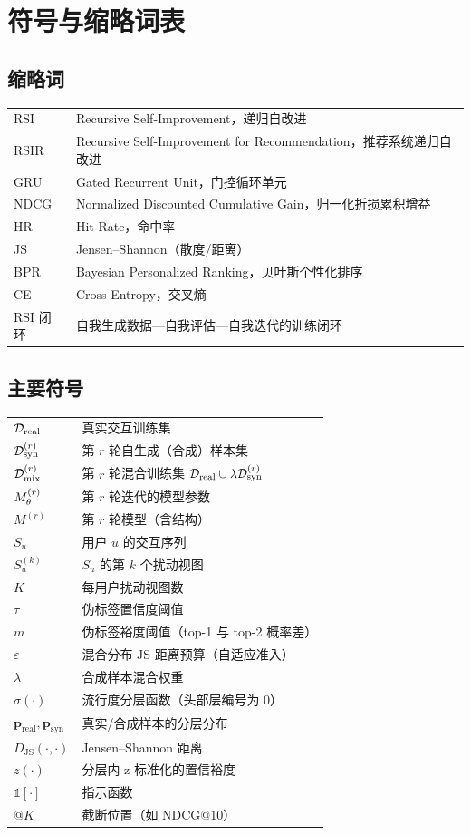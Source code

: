 \chapter*{符号与缩略词表}

\section*{缩略词}
\begin{tabular}{ll}
RSI & Recursive Self-Improvement，递归自改进\\
RSIR & Recursive Self-Improvement for Recommendation，推荐系统递归自改进\\
GRU & Gated Recurrent Unit，门控循环单元\\
NDCG & Normalized Discounted Cumulative Gain，归一化折损累积增益\\
HR & Hit Rate，命中率\\
JS & Jensen--Shannon（散度/距离）\\
BPR & Bayesian Personalized Ranking，贝叶斯个性化排序\\
CE & Cross Entropy，交叉熵\\
RSI 闭环 & 自我生成数据—自我评估—自我迭代的训练闭环\\
\end{tabular}

\section*{主要符号}
\begin{tabular}{ll}
$\mathcal{D}_{\mathrm{real}}$ & 真实交互训练集\\
$\mathcal{D}_{\mathrm{syn}}^{(r)}$ & 第 $r$ 轮自生成（合成）样本集\\
$\mathcal{D}_{\mathrm{mix}}^{(r)}$ & 第 $r$ 轮混合训练集 $\mathcal{D}_{\mathrm{real}} \cup \lambda\mathcal{D}_{\mathrm{syn}}^{(r)}$\\
$M_{\theta}^{(r)}$ & 第 $r$ 轮迭代的模型参数\\
$M^{(r)}$ & 第 $r$ 轮模型（含结构）\\
$S_u$ & 用户 $u$ 的交互序列\\
$S_u^{(k)}$ & $S_u$ 的第 $k$ 个扰动视图\\
$K$ & 每用户扰动视图数\\
$\tau$ & 伪标签置信度阈值\\
$m$ & 伪标签裕度阈值（top-1 与 top-2 概率差）\\
$\varepsilon$ & 混合分布 JS 距离预算（自适应准入）\\
$\lambda$ & 合成样本混合权重\\
$\sigma(\cdot)$ & 流行度分层函数（头部层编号为 0）\\
$\bm{p}_{\mathrm{real}}, \bm{p}_{\mathrm{syn}}$ & 真实/合成样本的分层分布\\
$D_{\mathrm{JS}}(\cdot,\cdot)$ & Jensen--Shannon 距离\\
$z(\cdot)$ & 分层内 z 标准化的置信裕度\\
$\mathbb{1}[\cdot]$ & 指示函数\\
@$K$ & 截断位置（如 NDCG@10）\\
\end{tabular}
